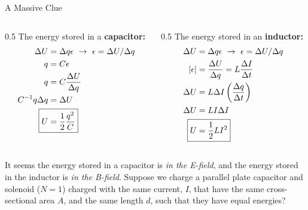 \documentclass{beamer}
\begin{document}
\begin{frame}{A Massive Clue}
\begin{columns}[T]
\begin{column}{0.5\textwidth}
\footnotesize
The energy stored in a \textbf{\alert{capacitor:}}
\begin{align}
\Delta U &= \Delta q \epsilon ~ \rightarrow ~ \epsilon = \Delta U/\Delta q \\
q &= C \epsilon \\
q &= C \frac{\Delta U}{\Delta q} \\
C^{-1} q \Delta q &= \Delta U \\
\Aboxed{U &= \frac{1}{2}\frac{q^2}{C}}
\end{align}
\end{column}
\begin{column}{0.5\textwidth}
\footnotesize
The energy stored in an \textbf{\alert{inductor:}}
\begin{align}
\Delta U &= \Delta q \epsilon ~ \rightarrow ~ \epsilon = \Delta U/\Delta q \\
|\epsilon| &= \frac{\Delta U}{\Delta q} = L \frac{\Delta I}{\Delta t} \\
\Delta U &= L \Delta I \left( \frac{\Delta q}{\Delta t} \right) \\
\Delta U &= L I \Delta I \\
\Aboxed{ U &= \frac{1}{2} L I^2}
\end{align}
\end{column}
\end{columns}
\footnotesize
It seems the energy stored in a capacitor is \textit{in the E-field}, and the energy stored in the inductor is \textit{in the B-field}.  Suppose we charge a parallel plate capacitor and solenoid ($N = 1$) charged with the same current, $I$, that have the same cross-sectional area $A$, and the same length $d$, such that they have equal energies?
\end{frame}
\end{document}

